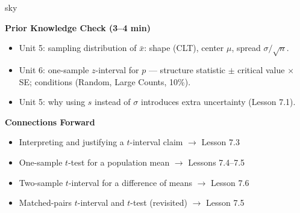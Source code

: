 \documentclass[10pt]{article}
\begin{document}
\begin{skillbox}{sky}
\begin{minipage}[t]{0.48\linewidth}
    \textbf{Prior Knowledge Check (3--4 min)}
    \begin{itemize}
        \item Unit 5: sampling distribution of $\bar x$: shape (CLT), center
              $\mu$, spread $\sigma/\sqrt{n}$.
        \item Unit 6: one-sample $z$-interval for $p$ --- structure statistic $\pm$
              critical value $\times$ SE; conditions (Random, Large Counts, 10\%).
        \item Unit 5: why using $s$ instead of $\sigma$ introduces extra uncertainty
              (Lesson 7.1).
    \end{itemize}
\end{minipage}
\hfill
\begin{minipage}[t]{0.48\linewidth}
    \textbf{Connections Forward}
    \begin{itemize}
        \item Interpreting and justifying a $t$-interval claim $\to$ Lesson 7.3
        \item One-sample $t$-test for a population mean $\to$ Lessons 7.4--7.5
        \item Two-sample $t$-interval for a difference of means $\to$ Lesson 7.6
        \item Matched-pairs $t$-interval and $t$-test (revisited) $\to$ Lesson 7.5
    \end{itemize}
\end{minipage}
\end{skillbox}
\end{document}

